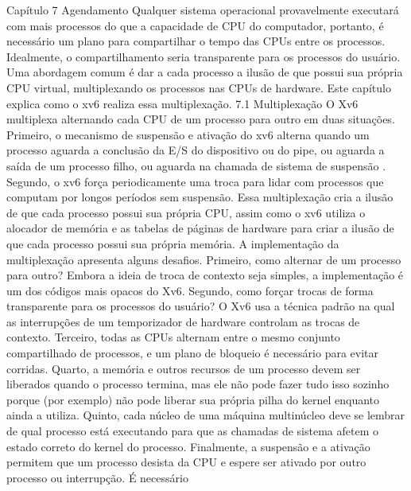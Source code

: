  Capítulo  7
 Agendamento
 Qualquer  sistema  operacional  provavelmente  executará  com  mais  processos  do  que  a  capacidade  de  CPU  do  
computador,  portanto,  é  necessário  um  plano  para  compartilhar  o  tempo  das  CPUs  entre  os  processos.  Idealmente,  o  
compartilhamento  seria  transparente  para  os  processos  do  usuário.  Uma  abordagem  comum  é  dar  a  cada  processo  a  
ilusão  de  que  possui  sua  própria  CPU  virtual,  multiplexando  os  processos  nas  CPUs  de  hardware.  Este  capítulo  explica  
como  o  xv6  realiza  essa  multiplexação.
 7.1  Multiplexação
 O  Xv6  multiplexa  alternando  cada  CPU  de  um  processo  para  outro  em  duas  situações.  Primeiro,  o  mecanismo  de  
suspensão  e  ativação  do  xv6  alterna  quando  um  processo  aguarda  a  conclusão  da  E/S  do  dispositivo  ou  do  pipe,  ou  
aguarda  a  saída  de  um  processo  filho,  ou  aguarda  na  chamada  de  sistema  de  suspensão .  Segundo,  o  xv6  força  
periodicamente  uma  troca  para  lidar  com  processos  que  computam  por  longos  períodos  sem  suspensão.  Essa  
multiplexação  cria  a  ilusão  de  que  cada  processo  possui  sua  própria  CPU,  assim  como  o  xv6  utiliza  o  alocador  de  
memória  e  as  tabelas  de  páginas  de  hardware  para  criar  a  ilusão  de  que  cada  processo  possui  sua  própria  memória.
 A  implementação  da  multiplexação  apresenta  alguns  desafios.  Primeiro,  como  alternar  de  um  processo  para  
outro?  Embora  a  ideia  de  troca  de  contexto  seja  simples,  a  implementação  é  um  dos  códigos  mais  opacos  do  Xv6.  
Segundo,  como  forçar  trocas  de  forma  transparente  para  os  processos  do  usuário?  O  Xv6  usa  a  técnica  padrão  na  
qual  as  interrupções  de  um  temporizador  de  hardware  controlam  as  trocas  de  contexto.  Terceiro,  todas  as  CPUs  
alternam  entre  o  mesmo  conjunto  compartilhado  de  processos,  e  um  plano  de  bloqueio  é  necessário  para  evitar  
corridas.  Quarto,  a  memória  e  outros  recursos  de  um  processo  devem  ser  liberados  quando  o  processo  termina,  mas  
ele  não  pode  fazer  tudo  isso  sozinho  porque  (por  exemplo)  não  pode  liberar  sua  própria  pilha  do  kernel  enquanto  ainda  
a  utiliza.  Quinto,  cada  núcleo  de  uma  máquina  multinúcleo  deve  se  lembrar  de  qual  processo  está  executando  para  
que  as  chamadas  de  sistema  afetem  o  estado  correto  do  kernel  do  processo.  Finalmente,  a  suspensão  e  a  ativação  
permitem  que  um  processo  desista  da  CPU  e  espere  ser  ativado  por  outro  processo  ou  interrupção.  É  necessário  

